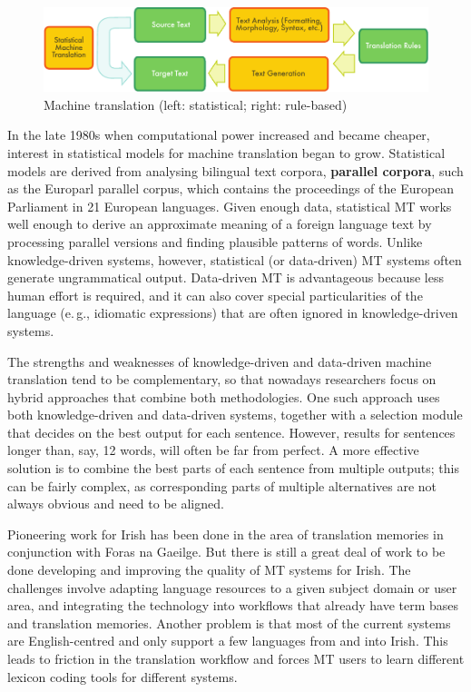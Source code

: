 \begin{multicols}{2}
\begin{figure}[htb]
  \center
  \includegraphics[width=\textwidth]{../_media/english/machine_translation}
  \caption{Machine translation (left: statistical; right: rule-based)}
\label{fig:mtarch_en}
\end{figure}

In the late 1980s when computational power increased and became cheaper, interest in statistical models for machine translation began to grow. Statistical models are derived from analysing bilingual text corpora, \textbf{parallel corpora}, such as the Europarl parallel corpus, which contains the proceedings of the European Parliament in 21 European languages. Given enough data, statistical MT works well enough to derive an approximate meaning of a foreign language text by processing parallel versions and finding plausible patterns of words. Unlike knowledge-driven systems, however, statistical (or data-driven) MT systems often generate ungrammatical output. Data-driven MT is advantageous because less human effort is required, and it can also cover special particularities of the language (e.\,g., idiomatic expressions) that are often ignored in knowledge-driven systems. 


The strengths and weaknesses of knowledge-driven and data-driven machine translation tend to be complementary, so that nowadays researchers focus on hybrid approaches that combine both methodologies. One such approach uses both knowledge-driven and data-driven systems, together with a selection module that decides on the best output for each sentence. However, results for sentences longer than, say, 12 words, will often be far from perfect. A more effective solution is to combine the best parts of each sentence from multiple outputs; this can be fairly complex, as corresponding parts of multiple alternatives are not always obvious and need to be aligned. 

Pioneering work for Irish has been done in the area of translation memories in conjunction with Foras na Gaeilge. But there is still a great deal of work to be done developing and improving the quality of MT systems for Irish. The challenges involve adapting language resources to a given subject domain or user area, and integrating the technology into workflows that already have term bases and translation memories. Another problem is that most of the current systems are English-centred and only support a few languages from and into Irish. This leads to friction in the translation workflow and forces MT users to learn different lexicon coding tools for different systems.


\end{multicols}
